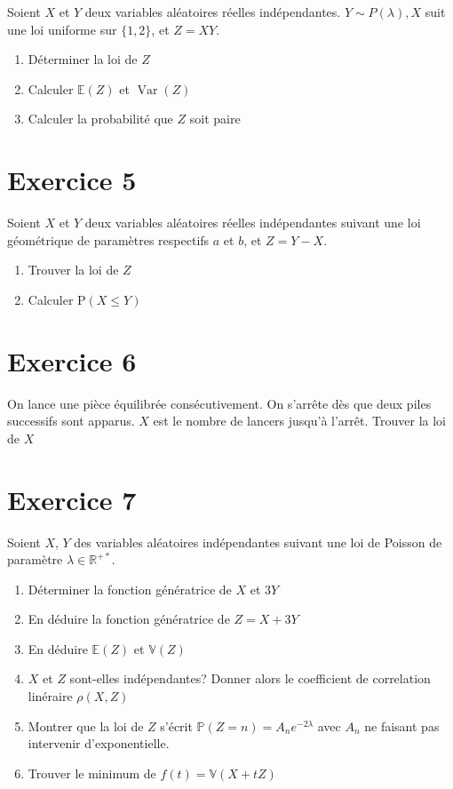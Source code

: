 \documentclass[11pt]{article}
\begin{document}
Soient $X$ et $Y$ deux variables aléatoires réelles indépendantes. $Y\sim P(\lambda), X$ suit une loi uniforme sur $\{1,2\}$, et $Z=XY$.

\begin{enumerate}
\item Déterminer la loi de $Z$
\item Calculer $\mathbb{E}(Z)$ et $\operatorname{Var}(Z)$
\item Calculer la probabilité que $Z$ soit paire
\end{enumerate}

\section*{Exercice 5}

Soient $X$ et $Y$ deux variables aléatoires réelles indépendantes suivant une loi géométrique de paramètres respectifs $a$ et $b$, et $Z=Y-X$. 

\begin{enumerate}
\item Trouver la loi de $Z$
\item Calculer $\mathrm{P}(X\leq Y)$
\end{enumerate}

\section*{Exercice 6}

On lance une pièce équilibrée consécutivement. On s'arrête dès que deux piles successifs sont apparus. $X$ est le nombre de lancers jusqu'à l'arrêt. Trouver la loi de $X$

\section*{Exercice 7}

Soient $X$, $Y$ des variables aléatoires indépendantes suivant une loi de Poisson de paramètre $\lambda \in \mathbb{R}^{+*}$.

\begin{enumerate}
\item Déterminer la fonction génératrice de $X$ et $3Y$
\item En déduire la fonction génératrice de $Z = X + 3Y$
\item En déduire $\mathbb{E}(Z)$ et $\mathbb{V}(Z)$
\item $X$ et $Z$ sont-elles indépendantes? Donner alors le coefficient de correlation linéraire $\rho(X,Z)$
\item Montrer que la loi de $Z$ s'écrit $\mathbb{P}(Z = n) = A_ne^{-2\lambda}$ avec $A_n$ ne faisant pas intervenir d'exponentielle.
\item Trouver le minimum de $f(t) = \mathbb{V}(X + tZ)$
\end{enumerate}
\end{document}
